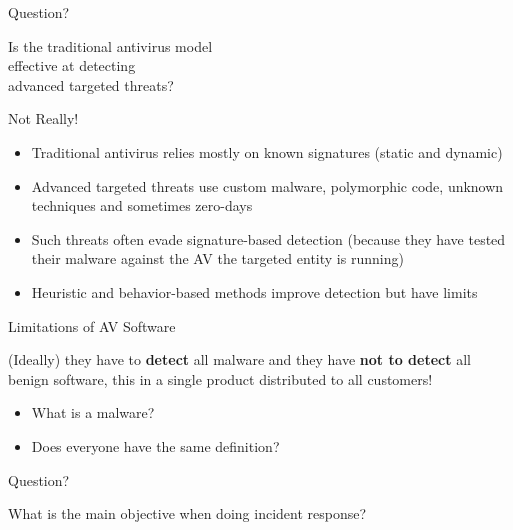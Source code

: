 \documentclass[12pt,aspectratio=169, colorlinks=true, linkcolor=circlBlue]{beamer}
\begin{document}
\begin{frame}{Question?}
	\begin{center}
		\Huge Is the traditional antivirus model\\
		effective at detecting\\
		advanced targeted threats?
	\end{center}
\end{frame}

\begin{frame}{Not Really!}
	\begin{itemize}
		\item Traditional antivirus relies mostly on known signatures (static and dynamic)
		\item Advanced targeted threats use custom malware, polymorphic code, unknown techniques and sometimes zero-days
		\item Such threats often evade signature-based detection (because they have tested their malware against the AV the targeted entity is running)
		\item Heuristic and behavior-based methods improve detection but have limits
	\end{itemize}
\end{frame}

\begin{frame}{Limitations of AV Software}

	(Ideally) they have to \textbf{detect} all malware and they have \textbf{not to detect}
	all benign software, this in a single product distributed to all customers!

	\begin{itemize}
		\item What is a malware?
		\item Does everyone have the same definition?
	\end{itemize}

\end{frame}

\begin{frame}{Question?}
	\begin{center}
		\Huge What is the main objective when doing incident response?
	\end{center}
\end{frame}
\end{document}
